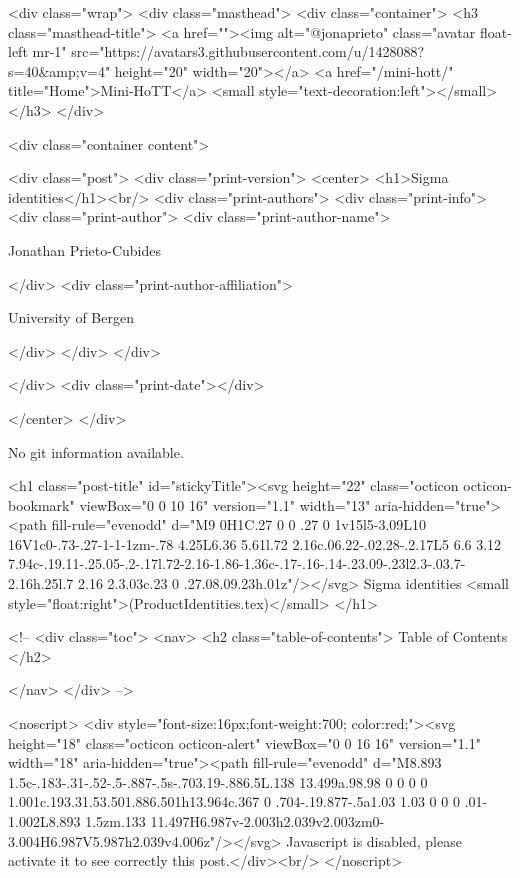     <div class="wrap">
      <div class="masthead">
        <div class="container">
          <h3 class="masthead-title">
            <a href=""><img alt="@jonaprieto" class="avatar float-left mr-1" src="https://avatars3.githubusercontent.com/u/1428088?s=40&amp;v=4" height="20" width="20"></a>
            <a href="/mini-hott/" title="Home">Mini-HoTT</a>
            <small style="text-decoration:left"></small>
          </h3>
        </div>
      
      <div class="container content">
        







<div class="post">
  <div class="print-version">
    <center>
      <h1>Sigma identities</h1><br/>
        <div class="print-authors">
          <div class="print-info">
            <div class="print-author">
              <div class="print-author-name">
                
                  Jonathan Prieto-Cubides
                
              </div>
              <div class="print-author-affiliation">
                
                  University of Bergen
                
                </div>
            </div>
          </div>
          
          
        </div>
        <div class="print-date"></div>
        
        
    </center>
  </div>

  
  No git information available.
  

  <h1 class="post-title" id="stickyTitle"><svg height="22" class="octicon octicon-bookmark" viewBox="0 0 10 16" version="1.1" width="13" aria-hidden="true"><path fill-rule="evenodd" d="M9 0H1C.27 0 0 .27 0 1v15l5-3.09L10 16V1c0-.73-.27-1-1-1zm-.78 4.25L6.36 5.61l.72 2.16c.06.22-.02.28-.2.17L5 6.6 3.12 7.94c-.19.11-.25.05-.2-.17l.72-2.16-1.86-1.36c-.17-.16-.14-.23.09-.23l2.3-.03.7-2.16h.25l.7 2.16 2.3.03c.23 0 .27.08.09.23h.01z"/></svg> Sigma identities <small style="float:right">(ProductIdentities.tex)</small>
  </h1>

  <!-- 
  <div class="toc">
    <nav>
    <h2 class="table-of-contents"> Table of Contents </h2>
      

    </nav>
  </div>
   -->

  <noscript>
  <div style="font-size:16px;font-weight:700; color:red;"><svg height="18" class="octicon octicon-alert" viewBox="0 0 16 16" version="1.1" width="18" aria-hidden="true"><path fill-rule="evenodd" d="M8.893 1.5c-.183-.31-.52-.5-.887-.5s-.703.19-.886.5L.138 13.499a.98.98 0 0 0 0 1.001c.193.31.53.501.886.501h13.964c.367 0 .704-.19.877-.5a1.03 1.03 0 0 0 .01-1.002L8.893 1.5zm.133 11.497H6.987v-2.003h2.039v2.003zm0-3.004H6.987V5.987h2.039v4.006z"/></svg> Javascript is disabled, please activate it to see correctly this post.</div><br/>
  </noscript>

